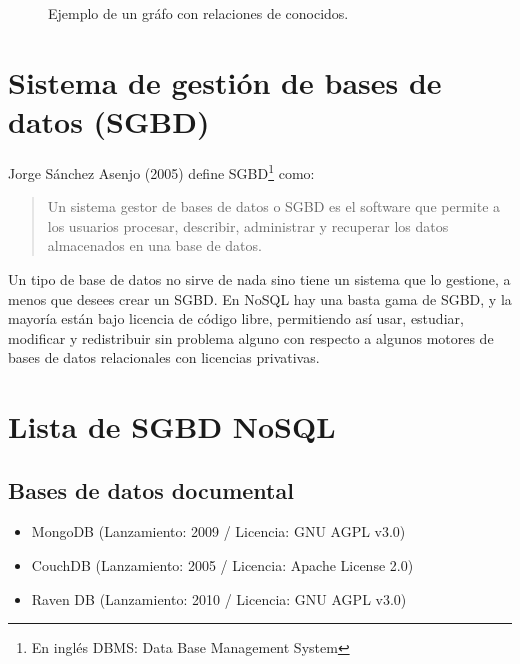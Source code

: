 \begin{figure}[!ht]
    \centering
     \caption[Bases de datos en grafo]{Ejemplo de un gr\'afo con relaciones de conocidos.}
\end{figure}

\section{Sistema de gesti\'on de bases de datos (SGBD)}

Jorge Sánchez Asenjo (2005) define SGBD\footnote{En ingl\'es DBMS: Data Base Management System} como:

\begin{quote}
Un sistema gestor de bases de datos o SGBD es el software que permite a los usuarios procesar, describir, administrar y recuperar los datos almacenados en una base de datos. 
\end{quote}

Un tipo de base de datos no sirve de nada sino tiene un sistema que lo gestione, a menos que desees crear un SGBD. En NoSQL hay una basta gama de SGBD, y la mayor\'ia est\'an bajo licencia de c\'odigo libre, permitiendo as\'i usar, estudiar, modificar y redistribuir sin problema alguno con respecto a algunos motores de bases de datos relacionales con licencias privativas.

\section{Lista de SGBD NoSQL}

\subsection*{Bases de datos documental}

\begin{itemize}
\item MongoDB (Lanzamiento: 2009 / Licencia: GNU AGPL v3.0)
\item CouchDB (Lanzamiento: 2005 / Licencia: Apache License 2.0)
\item Raven DB (Lanzamiento: 2010 / Licencia: GNU AGPL v3.0)
\end{itemize}


